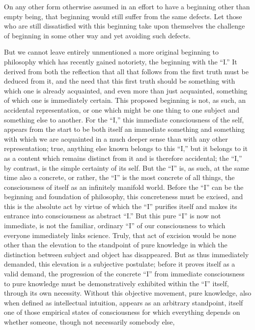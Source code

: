 On any other form otherwise assumed
in an effort to have a beginning
other than empty being,
that beginning would still
suffer from the same defects.
Let those who are still dissatisfied
with this beginning take upon themselves
the challenge of beginning in some other way
and yet avoiding such defects.

But we cannot leave entirely unmentioned
a more original beginning to philosophy
which has recently gained notoriety,
the beginning with the “I.”
It derived from both the reflection that
all that follows from the first truth
must be deduced from it,
and the need that this first truth
should be something with which one is already acquainted,
and even more than just acquainted,
something of which one is immediately certain.
This proposed beginning is not,
as such, an accidental representation,
or one which might be one thing
to one subject and something else to another.
For the “I,” this immediate consciousness of the self,
appears from the start to be both itself
an immediate something and something with which
we are acquainted in a much deeper sense than with any other representation;
true, anything else known belongs to this “I,”
but it belongs to it as a content which remains
distinct from it and is therefore accidental;
the “I,” by contrast, is the simple certainty of its self.
But the “I” is, as such, at the same time also a concrete,
or rather, the “I” is the most concrete of all things,
the consciousness of itself as an infinitely manifold world.
Before the “I” can be the beginning and foundation of philosophy,
this concreteness must be excised,
and this is the absolute act by virtue of which
the “I” purifies itself and makes its entrance
into consciousness as abstract “I.”
But this pure “I” is now not immediate,
is not the familiar, ordinary “I” of our consciousness
to which everyone immediately links science.
Truly, that act of excision would be
none other than the elevation to the standpoint of pure knowledge in
which the distinction between subject and object has disappeared.
But as thus immediately demanded,
this elevation is a subjective postulate;
before it proves itself as a valid demand,
the progression of the concrete “I”
from immediate consciousness to pure knowledge
must be demonstratively exhibited within the “I” itself,
through its own necessity.
Without this objective movement, pure knowledge,
also when defined as intellectual intuition,
appears as an arbitrary standpoint,
itself one of those empirical states of consciousness
for which everything depends on whether someone,
though not necessarily somebody else,
